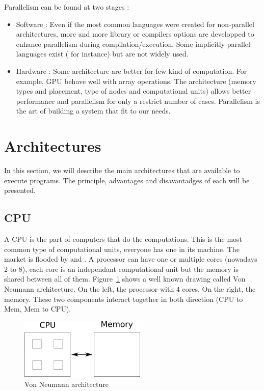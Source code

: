 Parallelism can be found at two stages :
\begin{itemize}
\item Software : Even if the most common languages were created for non-parallel architectures, more and more library or compilers options are developped to enhance parallelism during compilation/execution. Some implicitly parallel languages exist ( for instance) but are not widely used.
\item Hardware : Some architecture are better for few kind of computation. For example, \ac{GPU} behave well with array operations. The architecture (memory types and placement, type of nodes and computational units) allows better performance and parallelism  for only a restrict number of cases. Parallelism is the art of building a system that fit to our needs.
\end{itemize}

\section{Architectures}
In this section, we will describe the main architectures that are available to execute programs. The principle, advantages and disavantadges of each will be presented.

\subsection{CPU}
A \ac{CPU} is the part of computers that do the computations. This is the most common type of computational units, everyone has one in its machine. The market is flooded  by  and . A processor can have one or multiple cores (nowadays 2 to 8), each core is an independant computational unit but the memory is shared between all of them. Figure~\ref{fig:VonNeumann} shows a well known drawing called Von Neumann architecture. On the left, the processor with 4 cores. On the right, the memory. These two components interact together in both direction (\ac{CPU} to Mem, Mem to \ac{CPU}).
\begin{figure}
\centering
\includegraphics[width=6cm]{gfx/Parallelism/VonNeumann.png}
\caption{Von Neumann architecture}
\label{fig:VonNeumann}
\end{figure}

